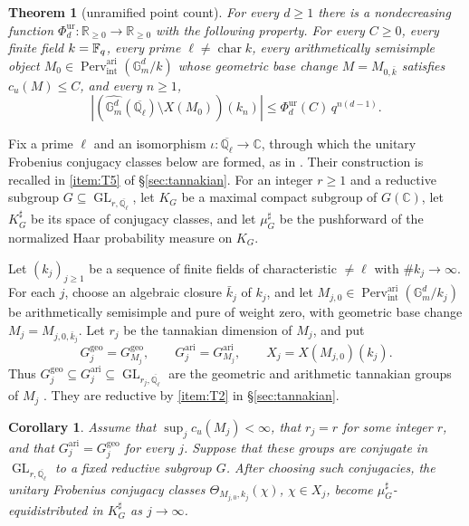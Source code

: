 \documentclass[12pt,reqno]{amsart}
\theoremstyle{definition}
\theoremstyle{plain}
\newtheorem{thm}[para]{Theorem}
\newtheorem{cor}[para]{Corollary}
\theoremstyle{definition}
\theoremstyle{remark}
\newcommand{\bbC}{\mathbb{C}}  \newcommand{\bbD}{\mathbb{D}}
\newcommand{\bbG}{\mathbb{G}}  \newcommand{\bbH}{\mathbb{H}}
\newcommand{\bbQ}{\mathbb{Q}}  \newcommand{\bbR}{\mathbb{R}}
\newcommand{\ol}[1]{\overline{#1}}
\newcommand{\Ql}{\bbQ_{\ell}}
\newcommand{\Gm}{\bbG_m}
\newcommand{\Perv}{\operatorname{Perv}}
\newcommand{\cu}{c_u}
\begin{document}
\begin{thm}[unramified point count]
\label{thm:unram-count}
For every \(d\ge1\) there is a nondecreasing function
\(\Phi^{\mathrm{ur}}_{d}:\mathbb R_{\ge0}\to\mathbb R_{\ge0}\) with the following property.  For
every \(C\ge0\), every finite field \(k=\mathbb{F}_q\), every prime
\(\ell\neq\operatorname{char}k\), every arithmetically semisimple object
\(M_0\in\Perv_{\mathrm{int}}^{\mathrm{ari}}(\Gm^d/k)\) whose geometric base change
\(M=M_{0,\bar k}\) satisfies \(\cu(M)\le C\), and every \(n\ge1\),
\[
        |(\widehat{\Gm^d}(\ol\Ql)\setminus X(M_0))(k_n)|
        \le \Phi^{\mathrm{ur}}_{d}(C)\,q^{n(d-1)} .
\]
\end{thm}

Fix a prime \(\ell\) and an isomorphism \(\iota\colon\ol\Ql\to\bbC\), through which the unitary
Frobenius conjugacy classes below are formed, as in \cite[\S3.9]{ForeyFresanKowalski2021}.  Their
construction is recalled in \ref{item:T5} of \S\ref{sec:tannakian}.  For an integer
\(r\ge1\) and a reductive subgroup \(G\subseteq\operatorname{GL}_{r,\ol\Ql}\), let \(K_G\) be a maximal
compact subgroup of \(G(\bbC)\), let \(K_G^\sharp\) be its space of conjugacy classes, and let
\(\mu_G^\sharp\) be the pushforward of the normalized Haar probability measure on \(K_G\).

Let \((k_j)_{j\ge1}\) be a sequence of finite fields of characteristic \(\neq\ell\) with \(\#k_j\to\infty\).
For each \(j\), choose an algebraic closure \(\bar k_j\) of \(k_j\), and let
\(M_{j,0}\in\Perv_{\mathrm{int}}^{\mathrm{ari}}(\Gm^d/k_j)\) be arithmetically semisimple and pure of
weight zero, with geometric base change \(M_j=M_{j,0,\bar k_j}\).  Let \(r_j\) be the tannakian dimension
of \(M_j\), and put
\[
 G_j^{\mathrm{geo}}=G^{\mathrm{geo}}_{M_j},\qquad
 G_j^{\mathrm{ari}}=G^{\mathrm{ari}}_{M_j},\qquad
 X_j=X(M_{j,0})(k_j).
\]
Thus \(G_j^{\mathrm{geo}}\subseteq G_j^{\mathrm{ari}}\subseteq\operatorname{GL}_{r_j,\ol\Ql}\) are the
geometric and arithmetic tannakian groups of \(M_j\) \cite[Ch.~3]{ForeyFresanKowalski2021}.  They are
reductive by \ref{item:T2} in \S\ref{sec:tannakian}.

\begin{cor}
\label{cor:equidistribution}
Assume that \(\sup_j\cu(M_j)<\infty\), that \(r_j=r\) for some integer \(r\), and that
\(G_j^{\mathrm{ari}}=G_j^{\mathrm{geo}}\) for every \(j\).  Suppose that these groups are conjugate in
\(\operatorname{GL}_{r,\ol\Ql}\) to a fixed reductive subgroup \(G\).  After choosing such conjugacies,
the unitary Frobenius conjugacy classes \(\Theta_{M_{j,0},k_j}(\chi)\), \(\chi\in X_j\), become
\(\mu_G^\sharp\)-equidistributed in \(K_G^\sharp\) as \(j\to\infty\).
\end{cor}
\end{document}
